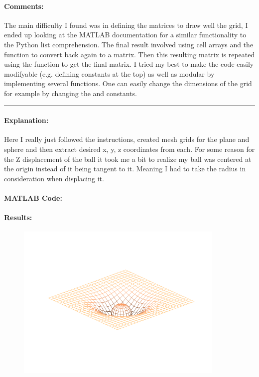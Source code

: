\paragraph{Comments:}
The main difficulty I found was in defining the matrices to draw well the grid, I ended up looking at the MATLAB documentation for a similar functionality to the Python list comprehension.
The final result involved using cell arrays and the  function to convert back again to a matrix.
Then this resulting matrix is repeated using the  function to get the final matrix.
I tried my best to make the code easily modifyable (e.g. defining constants at the top) as well as modular by implementing several functions.
One can easily change the dimensions of the grid for example by changing the  and  constants.


\bigskip
\hrule



\paragraph{Explanation:}
Here I really just followed the instructions, created mesh grids for the plane and sphere and then extract desired x, y, z coordinates from each.
For some reason for the Z displacement of the ball it took me a bit to realize my ball was centered at the origin instead of it being tangent to it.
Meaning I had to take the radius in consideration when displacing it.

\paragraph{MATLAB Code:}
\begin{tiny}
    
\end{tiny}

\paragraph{Results:}
\begin{figure}[H]
    \centering
    \includegraphics[width=10cm]{figures/ex2}
\end{figure}

